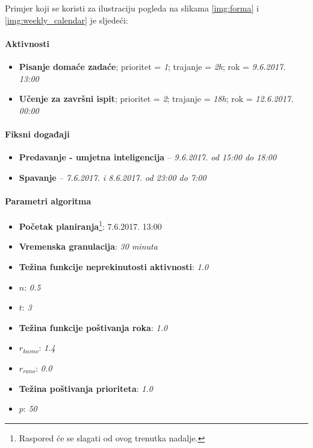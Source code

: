 \documentclass[times, utf8, zavrsni]{fer}
\begin{document}
\bigskip
\begin{myframe}

Primjer koji se koristi za ilustraciju pogleda na slikama \ref{img:forma} i  \ref{img:weekly_calendar} je sljedeći:

\paragraph{Aktivnosti}
\begin{itemize}
	\item \textbf{Pisanje domaće zadaće}; prioritet = \textit{1}; trajanje = \textit{2h}; rok = \textit{9.6.2017. 13:00}
	\item \textbf{Učenje za završni ispit}; prioritet = \textit{2}; trajanje = \textit{18h}; rok = \textit{12.6.2017. 00:00}
\end{itemize}

\paragraph{Fiksni događaji}
\begin{itemize}
	\item \textbf{Predavanje - umjetna inteligencija} -- \textit{9.6.2017. od 15:00 do 18:00}
	\item \textbf{Spavanje} -- \textit{7.6.2017. i 8.6.2017. od 23:00 do 7:00}
\end{itemize}

\paragraph{Parametri algoritma}
\boldmath
\begin{itemize}
	\item \textbf{Početak planiranja}\footnote{Raspored će se slagati od ovog trenutka nadalje.}: 7.6.2017. 13:00
	\item \textbf{Vremenska granulacija}: \textit{30 minuta}
	\item \textbf{Težina funkcije neprekinutosti aktivnosti}: \textit{1.0}
	\item $n$: \textit{0.5}
	\item $t$: \textit{3}
	\item \textbf{Težina funkcije poštivanja roka}: \textit{1.0}
	\item $r_{kasno}$: \textit{1.4}
	\item $r_{rano}$: \textit{0.0}
	\item \textbf{Težina poštivanja prioriteta}: \textit{1.0}
	\item $p$: \textit{50}
\end{itemize}

\end{myframe}
\end{document}
